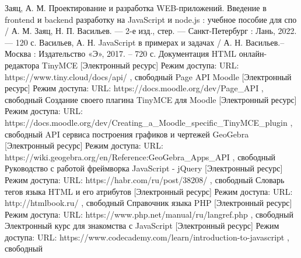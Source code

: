 \documentclass[14pt,Diplom]{diplomwork}
\begin{document}
\begin{thebibliography}{99}
 Заяц, А. М. Проектирование и разработка WEB-приложений. Введение в frontend и backend разработку на JavaScript и node.js : учебное пособие для спо / А. М. Заяц, Н. П. Васильев. — 2-е изд., стер. — Санкт-Петербург : Лань, 2022. — 120 с. 
 Васильев, А. Н. JavaScript в примерах и задачах / А. Н. Васильев.– Москва :
Издательство «Э», 2017. – 720 с.	
 Документация HTML онлайн-редактора TinyMCE [Электронный ресурс] Режим доступа: URL: https://www.tiny.cloud/docs/api/ , свободный
 Page API Moodle [Электронный ресурс] Режим доступа: URL: https://docs.moodle.org/dev/Page\_API , свободный
 Создание своего плагина TinyMCE для Moodle  [Электронный ресурс] Режим доступа: URL: https://docs.moodle.org/dev/Creating\_a\_Moodle\_specific\_TinyMCE\_plugin , свободный
 API сервиса построения графиков и чертежей GeoGebra [Электронный ресурс] Режим доступа: URL: https://wiki.geogebra.org/en/Reference:GeoGebra\_Apps\_API , свободный
 Руководство с работой фреймворка JavaScript - jQuery [Электронный ресурс] Режим доступа: URL: https://habr.com/ru/post/38208/ , свободный
 Словарь тегов языка HTML и его атрибутов [Электронный ресурс] Режим доступа: URL: http://htmlbook.ru/ , свободный
 Справочник языка PHP [Электронный ресурс] Режим доступа: URL: https://www.php.net/manual/ru/langref.php	 , свободный
 Электронный курс для знакомства с JavaScript [Электронный ресурс] Режим доступа: URL: https://www.codecademy.com/learn/introduction-to-javascript	 , свободный
\end{thebibliography}
\end{document}

